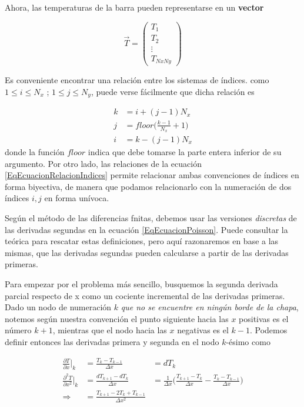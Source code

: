Ahora, las temperaturas de la barra 
pueden representarse en un \textbf{vector} 

\begin{equation} \label{EqEcuacionVectorT}
  \vec{T} = 
  \begin{pmatrix}
    T_1 \\ T_2 \\ \vdots \\ T_{Nx Ny}
  \end{pmatrix}
\end{equation}

Es conveniente encontrar una relación entre los sistemas
de índices. como $1 \leq i \leq N_x $ ; $1 \leq j \leq  N_y$, puede verse
fácilmente que dicha relación es

\begin{equation}\label{EqEcuacionRelacionIndices}
  \begin{aligned}
  k &= i + (j-1)N_x \\
  j &= floor \bigg( \frac{k-1}{N_x} +1  \bigg)\\
  i &= k - (j-1)N_x
  \end{aligned}
\end{equation}
donde la función $floor$ indica que debe tomarse la parte
entera inferior de su argumento. Por otro lado, las relaciones
de la ecuación \ref{EqEcuacionRelacionIndices} permite
relacionar ambas convenciones de índices en forma biyectiva, 
de manera que podamos relacionarlo
con la numeración de dos índices $i,j$ en forma unívoca.


Según el método de las diferencias fnitas, debemos
usar las versiones \emph{discretas} de las derivadas
segundas en la ecuación \ref{EqEcuacionPoisson}. 
Puede consultar la teórica para rescatar estas 
definiciones, pero aquí razonaremos en base a las
mismas, que las derivadas segundas pueden calcularse
a partir de las derivadas primeras. 

Para empezar por el problema más sencillo, busquemos la
segunda derivada parcial respecto de x como un cociente 
incremental de las derivadas primeras. 
Dado un nodo de 
numeración $k$ \emph{que no se encuentre en ningún borde
de la chapa}, notemos según nuestra convención el punto
siguiente hacia las $ x $ positivas es el número $k+1$, mientras
que el nodo hacia las $ x $ negativas es el $k-1$. Podemos
definir entonces las derivadas primera y segunda en el
nodo $k$-ésimo como 

\begin{equation}\label{EqEcuacionDerivadaX}
    \begin{aligned}
    \frac{\partial T}{\partial x} \Bigr\rvert _k &=
			   \frac{T_{k}-T_{k-1}}{\Delta x} &= dT_k  \\
    \frac{\partial^2 T}{\partial x^2} \Bigr\rvert _k &=
    \frac{dT_{k+1}- dT_k}{\Delta x}                  &= 
			   \frac{1}{\Delta x} \big(
			   \frac{T_{k+1}-T_k}{\Delta x}
			   -
			   \frac{T_{k}-T_{k-1} }{\Delta x}
			   \big)\\
    \Rightarrow  &= 
    \frac{T_{k+1} - 2T_k +T_{k-1} }{\Delta x ^2}
  \end{aligned}
\end{equation}

